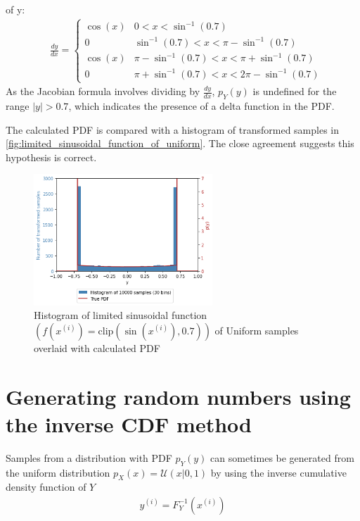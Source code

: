 \documentclass[a4paper]{article}
\begin{document}
of y:
\begin{align*}
    & \frac{dy}{dx} =
    \begin{cases}
        \cos(x) & 0 < x < \sin^{-1}(0.7) \\
        0 & \sin^{-1}(0.7) < x < \pi - \sin^{-1}(0.7) \\
        \cos(x) & \pi - \sin^{-1}(0.7) < x < \pi + \sin^{-1}(0.7) \\
        0 & \pi + \sin^{-1}(0.7) < x < 2\pi - \sin^{-1}(0.7)
   \end{cases}
\end{align*}
As the Jacobian formula involves dividing by $\frac{dy}{dx}$, $p_Y(y)$ is undefined for the range $|y| > 0.7$, which
indicates the presence of a delta function in the PDF.

The calculated PDF is compared with a histogram of transformed samples in \autoref{fig:limited_sinusoidal_function_of_uniform}.
The close agreement suggests this hypothesis is correct.

\begin{figure}[h]
    \centering
    \includegraphics[width=0.6\textwidth]{figures/limited_sinusoidal_function_of_uniform.png}
    \caption{Histogram of limited sinusoidal function $\left(f(x^{(i)}) = \text{clip}\left(\sin\left(x^{(i)}\right), 0.7\right)\right)$
        of Uniform samples overlaid with calculated PDF}
    \label{fig:limited_sinusoidal_function_of_uniform}
\end{figure}


\section{Generating random numbers using the inverse CDF method}

Samples from a distribution with PDF $p_Y(y)$ can sometimes be generated from the uniform distribution
$p_X(x) = \mathcal{U}(x | 0, 1)$ by using the inverse cumulative density function of $Y$
\begin{align*}
    y^{(i)} = F_Y^{-1} \left( x^{(i)} \right)
\end{align*}
\end{document}
